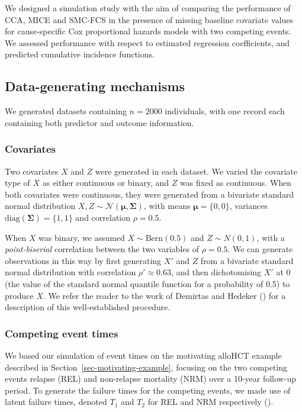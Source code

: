 \documentclass[
  letterpaper,
  paper=240mm:170mm,
  twoside=true,
  open=right,
  fontsize=10pt,
  pagesize=false,
  BCOR=15mm,
  DIV=14,
  headinclude=true,
  footinclude=false,
  headsepline=on]{scrbook}
\begin{document}
We designed a simulation study with the aim of comparing the performance
of CCA, MICE and SMC-FCS in the presence of missing baseline covariate
values for cause-specific Cox proportional hazards models with two
competing events. We assessed performance with respect to estimated
regression coefficients, and predicted cumulative incidence functions.

\subsection{Data-generating
mechanisms}\label{data-generating-mechanisms}

We generated datasets containing \(n = 2000\) individuals, with one
record each containing both predictor and outcome information.

\subsubsection{Covariates}\label{covariates}

Two covariates \(X\) and \(Z\) were generated in each dataset. We varied
the covariate type of \(X\) as either continuous or binary, and \(Z\)
was fixed as continuous. When both covariates were continuous, they were
generated from a bivariate standard normal distribution
\(X,Z \sim \mathcal{N}(\boldsymbol{\mu}, \boldsymbol{\Sigma})\), with
means \(\boldsymbol{\mu} = \{0, 0\}\), variances
\(\text{diag}(\boldsymbol{\Sigma}) = \{1, 1\}\) and correlation
\(\rho = 0.5\).

When \(X\) was binary, we assumed \(X \sim \text{Bern}(0.5)\) and
\(Z \sim N(0, 1)\), with a \emph{point-biserial} correlation between the
two variables of \(\rho = 0.5\). We can generate observations in this
way by first generating \(X'\) and \(Z\) from a bivariate standard
normal distribution with correlation \(\rho' \approx 0.63\), and then
dichotomising \(X'\) at 0 (the value of the standard normal quantile
function for a probability of 0.5) to produce \(X\). We refer the reader
to the work of Demirtas and Hedeker
() for
a description of this well-established procedure.

\subsubsection{Competing event times}\label{competing-event-times}

We based our simulation of event times on the motivating alloHCT example
described in Section~\ref{sec-motivating-example}, focusing on the two
competing events relapse (REL) and non-relapse mortality (NRM) over a
10-year follow-up period. To generate the failure times for the
competing events, we made use of latent failure times, denoted \(T_1\)
and \(T_2\) for REL and NRM respectively
().
\end{document}
